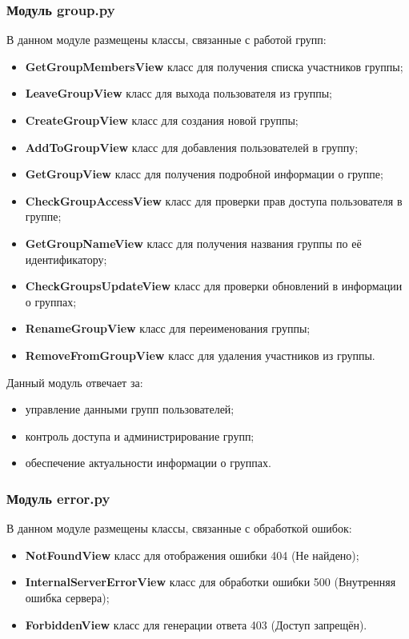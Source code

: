 \subsubsection{Модуль group.py}
В данном модуле размещены классы, связанные с работой групп:
\begin{itemize}
	\item \textbf{GetGroupMembersView} класс для получения списка участников группы;
	\item \textbf{LeaveGroupView} класс для выхода пользователя из группы;
	\item \textbf{CreateGroupView} класс для создания новой группы;
	\item \textbf{AddToGroupView} класс для добавления пользователей в группу;
	\item \textbf{GetGroupView} класс для получения подробной информации о группе;
	\item \textbf{CheckGroupAccessView} класс для проверки прав доступа пользователя в группе;
	\item \textbf{GetGroupNameView} класс для получения названия группы по её идентификатору;
	\item \textbf{CheckGroupsUpdateView} класс для проверки обновлений в информации о группах;
	\item \textbf{RenameGroupView} класс для переименования группы;
	\item \textbf{RemoveFromGroupView} класс для удаления участников из группы.
\end{itemize}

Данный модуль отвечает за:

\begin{itemize}
	\item управление данными групп пользователей;
	\item контроль доступа и администрирование групп;
	\item обеспечение актуальности информации о группах.
\end{itemize}

\subsubsection{Модуль error.py}
В данном модуле размещены классы, связанные с обработкой ошибок:
\begin{itemize}
	\item \textbf{NotFoundView} класс для отображения ошибки 404 (Не найдено);
	\item \textbf{InternalServerErrorView} класс для обработки ошибки 500 (Внутренняя ошибка сервера);
	\item \textbf{ForbiddenView} класс для генерации ответа 403 (Доступ запрещён).
\end{itemize}

